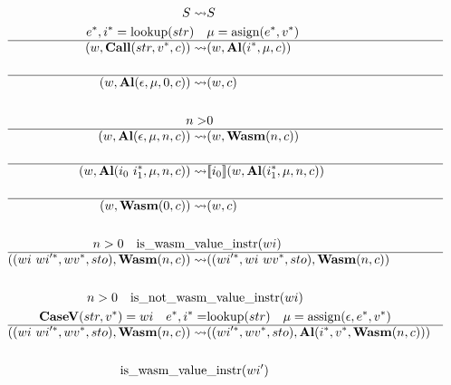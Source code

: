 
\newpage

\begin{align*}
\newline \\
  S \leadsto& S
%
\newline \\
  \seq e, \seq i = \text{lookup}(str) \quad& \mu = \text{asign}(\seq e, \seq v) \\
  \hline
  (w, \call (str, \seq v, c)) \leadsto& (w, \al (\seq i, \mu, c)) \\
%
\newline \\
  \hline
  (w, \al (\epsilon, \mu, 0, c)) \leadsto& (w, c) \\
%
\newline \\
  n >& 0 \\
  \hline
  (w, \al (\epsilon, \mu, n, c)) \leadsto& (w, \wasm (n, c)) \\
%
\newline \\
  \hline
  (w, \al (i_0 ~ \seq{i_1}, \mu, n, c)) \leadsto& \sem{i_0}(w, \al (\seq{i_1}, \mu, n, c)) \\
%
\newline \\
  \hline
  (w, \wasm (0, c)) \leadsto& (w, c) \\
%
\newline \\
  n > 0 \quad \text{is\_wasm\_va}&\text{lue\_instr}(wi) \\
  \hline
  ((wi ~ \seq{wi'}, \seq{wv}, sto), \wasm (n, c))
  \leadsto&
  ((\seq{wi'}, wi ~ \seq{wv}, sto), \wasm (n, c)) \\
%
\newline \\
  n > 0 \quad \text{is\_not\_wasm}&\text{\_value\_instr}(wi) \\
  \textbf{CaseV} (str, \seq v) = wi \quad
  \seq e, \seq i =& \text{lookup}(str) \quad
  \mu = \text{assign}(\epsilon, \seq e, \seq v) \\
  \hline
  ((wi ~ \seq{wi'}, \seq{wv}, sto), \wasm (n, c))
  \leadsto&
  ((\seq{wi'}, \seq{wv}, sto), \al (\seq i, \seq v, \wasm (n, c))) \\
%
\newline \\
  \text{is\_wasm\_value}&\text{\_instr}(wi') \\

\end{align*}
